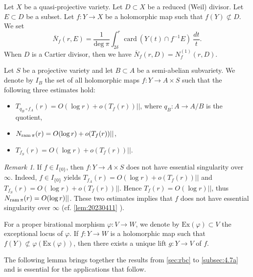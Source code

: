 \documentclass[11pt,english]{smfart}
\theoremstyle{plain}
\theoremstyle{definition}
\theoremstyle{remark}
\newtheorem{rem}[thm]{Remark}
\numberwithin{equation}{section}
\theoremstyle{plain}
\newcommand{\ram}{{\rm ram}\,}
\begin{document}
	
	
	
	
	
	Let $X$ be a quasi-projective variety.
	Let $D\subset X$ be a reduced (Weil) divisor.
	Let $E\subset D$ be a subset.
	Let $f:Y\to X$ be a holomorphic map such that $f(Y)\not\subset D$.
	We set
	$$
	\overline{N}_f(r, E)=\frac{1}{\mathrm{deg}\ \pi} \int_{2\delta}^{r}\mathrm{card}\ (Y(t)\cap f^{-1}E)\ \frac{d t}{t} .
	$$
	When $D$ is a Cartier divisor, then we have $\overline{N}_f(r,D)=N^{(1)}_f(r,D)$.
	
	
	
	
	Let $S$ be a projective variety and let $B\subset A$ be a semi-abelian subvariety.
	We denote by $I_B$ the set of all holomorphic maps $f:Y\to A\times S$ such that the following three estimates hold:
	\begin{itemize}
		\item 
		$T_{q_B\circ f_A}(r)=O(\log r)+o(T_f(r))||$, where $q_B:A\to A/B$ is the quotient,
		\item
		$N_{\ram\pi}(r)=O(\log r)+o(T_f(r))||$,
		\item
		$T_{f_S}(r)=O(\log r)+o(T_f(r))||$.
	\end{itemize}
	
	\begin{rem}\label{rem:20221203}
		If $f\in I_{\{0\}}$, then $f:Y\to A\times S$ does not have essential singularity over $\infty$.
		Indeed, $f\in I_{\{0\}}$ yields $T_{f_A}(r)=O(\log r)+o(T_f(r))||$ and  $T_{f_S}(r)=O(\log r)+o(T_f(r))||$.
		Hence $T_f(r)=O(\log r)||$, thus $N_{\ram\pi}(r)=O(\log r)||$.
		These two estimates implies that $f$ does not have essential singularity over $\infty$ (cf. \cref{lem:20230411} ). 
	\end{rem}
	
	For a proper birational morphism $\varphi:V\to W$, we denote by $\mathrm{Ex}(\varphi)\subset V$ the exceptional locus of $\varphi$.
	If $f:Y\to W$ is a holomorphic map such that $f(Y)\not\subset \varphi(\mathrm{Ex}(\varphi))$, then there exists a unique lift $g:Y\to V$ of $f$.
	
	
	
	The following lemma brings together the results from \cref{sec:rbc} to \cref{subsec:4.7a} and is essential for the applications that follow.
	
\end{document}
